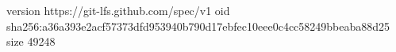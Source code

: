 version https://git-lfs.github.com/spec/v1
oid sha256:a36a393e2acf57373dfd953940b790d17ebfec10eee0c4cc58249bbeaba88d25
size 49248
